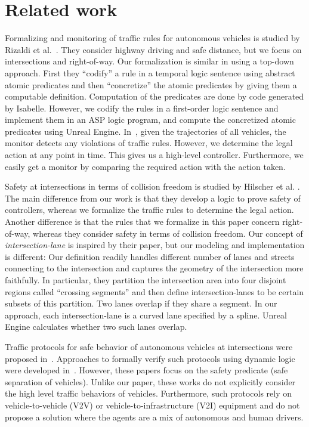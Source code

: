 \section{Related work}
Formalizing and monitoring of traffic rules for autonomous vehicles
is studied by Rizaldi et al.~\cite{Rizaldi.2017}.
They consider highway driving and safe distance,
but we focus on intersections and right-of-way.
Our formalization is similar in using a top-down approach.
First they ``codify'' a rule in a temporal logic sentence using abstract atomic predicates
and then ``concretize'' the atomic predicates by giving them a computable definition.
Computation of the predicates are done by code generated by Isabelle.
However,
we codify the rules in a first-order logic sentence and implement them in an ASP logic program,
and compute the concretized atomic predicates using Unreal Engine.
In~\cite{Rizaldi.2017},
given the trajectories
of all vehicles,
the monitor detects any violations of traffic rules.
However,
we determine the legal action at any point in time.
This gives us a high-level controller.
Furthermore,
we easily get a monitor by comparing the required action
with the action taken.


Safety at intersections in terms of collision freedom
is studied by Hilscher et al. \cite{Hilscher.2016}.
The main difference from our work is that they develop a logic to prove safety of controllers,
whereas we formalize the traffic rules to determine the legal action.
Another difference is that the rules that we formalize in this paper concern right-of-way,
whereas they consider safety in terms of collision freedom.
Our concept of \emph{intersection-lane} is inspired by their paper,
but our modeling and implementation is different:
Our definition readily handles different number of lanes and streets connecting to the intersection and captures the geometry of the intersection more faithfully.
In particular, they partition the intersection area into four disjoint regions called ``crossing segments'' and then define intersection-lanes to be certain subsets of this partition.
Two lanes overlap if they share a segment.
In our approach, each intersection-lane is a curved lane specified by a spline.
Unreal Engine calculates whether two such lanes overlap.

Traffic protocols for safe behavior of autonomous vehicles at intersections
were proposed in~\cite{azimi2011vehicular,hafner2013cooperative}.
Approaches to formally verify such protocols using dynamic logic
were developed in~\cite{loos2011safe}.
However,
these papers focus on the safety predicate (safe separation of vehicles).
Unlike our paper,
these works do not explicitly consider the high level traffic behaviors of vehicles.
Furthermore, such protocols rely on vehicle-to-vehicle (V2V) or vehicle-to-infrastructure (V2I) equipment and do not propose a solution where the agents are a mix of autonomous and human drivers. 


